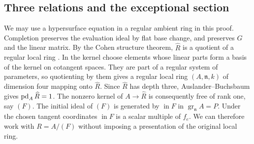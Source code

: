 \subsection{Three relations and the exceptional section}
We may use a hypersurface equation in a regular ambient ring in this proof. Completion preserves the evaluation ideal by flat base change, and preserves $G$ and the linear matrix. By the Cohen structure theorem, $\widehat R$ is a quotient of a regular local ring \cite{Stacks}. In the kernel choose elements whose linear parts form a basis of the kernel on cotangent spaces. They are part of a regular system of parameters, so quotienting by them gives a regular local ring $(A,\mathfrak n,k)$ of dimension four mapping onto $\widehat R$. Since $\widehat R$ has depth three, Auslander--Buchsbaum gives $\operatorname{pd}_A\widehat R=1$. The nonzero kernel of $A\to\widehat R$ is consequently free of rank one, say $(F)$. The initial ideal of $(F)$ is generated by $\operatorname{in}F$ in $\operatorname{gr}_{\mathfrak n} A=P$. Under the chosen tangent coordinates $\operatorname{in}F$ is a scalar multiple of $f_e$. We can therefore work with $R=A/(F)$ without imposing a presentation of the original local ring.

